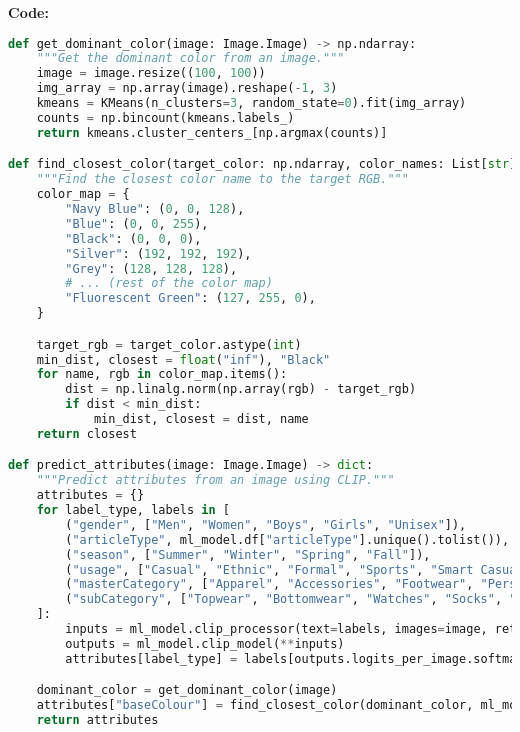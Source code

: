 \documentclass[12pt,a4paper]{article}
\begin{document}
\textbf{Code:}
\begin{lstlisting}[language=Python]
def get_dominant_color(image: Image.Image) -> np.ndarray:
    """Get the dominant color from an image."""
    image = image.resize((100, 100))
    img_array = np.array(image).reshape(-1, 3)
    kmeans = KMeans(n_clusters=3, random_state=0).fit(img_array)
    counts = np.bincount(kmeans.labels_)
    return kmeans.cluster_centers_[np.argmax(counts)]

def find_closest_color(target_color: np.ndarray, color_names: List[str]) -> str:
    """Find the closest color name to the target RGB."""
    color_map = {
        "Navy Blue": (0, 0, 128),
        "Blue": (0, 0, 255),
        "Black": (0, 0, 0),
        "Silver": (192, 192, 192),
        "Grey": (128, 128, 128),
		# ... (rest of the color map)
        "Fluorescent Green": (127, 255, 0),
    }

    target_rgb = target_color.astype(int)
    min_dist, closest = float("inf"), "Black"
    for name, rgb in color_map.items():
        dist = np.linalg.norm(np.array(rgb) - target_rgb)
        if dist < min_dist:
            min_dist, closest = dist, name
    return closest

def predict_attributes(image: Image.Image) -> dict:
    """Predict attributes from an image using CLIP."""
    attributes = {}
    for label_type, labels in [
        ("gender", ["Men", "Women", "Boys", "Girls", "Unisex"]),
        ("articleType", ml_model.df["articleType"].unique().tolist()),
        ("season", ["Summer", "Winter", "Spring", "Fall"]),
        ("usage", ["Casual", "Ethnic", "Formal", "Sports", "Smart Casual", "Travel", "Party", "Home"]),
        ("masterCategory", ["Apparel", "Accessories", "Footwear", "Personal Care", "Free Items", "Sporting Goods", "Home"]),
        ("subCategory", ["Topwear", "Bottomwear", "Watches", "Socks", "Shoes", "Belts", "Flip Flops", "Bags", "Innerwear", "Sandal", "Shoe Accessories", "Fragrance", "Jewellery", "Lips", "Saree", "Eyewear", "Nails", "Scarves", "Dress", "Loungewear and Nightwear", "Wallets", "Apparel Set", "Headwear", "Mufflers", "Skin Care", "Makeup", "Free Gifts", "Ties", "Accessories", "Skin", "Beauty Accessories", "Water Bottle", "Eyes", "Bath and Body", "Gloves", "Sports Accessories", "Cufflinks", "Sports Equipment", "Stoles", "Hair", "Perfumes", "Home Furnishing", "Umbrellas", "Wristbands", "Vouchers"])
    ]:
        inputs = ml_model.clip_processor(text=labels, images=image, return_tensors="pt", padding=True)
        outputs = ml_model.clip_model(**inputs)
        attributes[label_type] = labels[outputs.logits_per_image.softmax(dim=1).argmax().item()]

    dominant_color = get_dominant_color(image)
    attributes["baseColour"] = find_closest_color(dominant_color, ml_model.df["baseColour"].unique().tolist())
    return attributes
\end{lstlisting}
\end{document}
